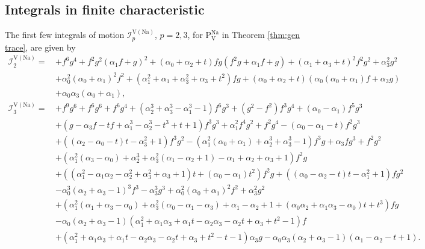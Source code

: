 \documentclass[a4paper,reqno]{amsart}
\numberwithin{equation}{section}
\numberwithin{figure}{section}
\theoremstyle{remark}
\newcommand\Pfive{\textrm{P}_{\textrm{V}}}
\begin{document}
\subsection{Integrals in finite characteristic}
The first few integrals of motion $\mathcal{I}_p^{\textrm{V}(\text{Na})}$, $p=2,3$, for $\Pfive^\text{Na}$ in Theorem \ref{thm:gen trace}, are given by
\begin{align*}
    \mathcal{I}_2^{\textrm{V}(\text{Na})}=\,&+f^6 g^4+f^2 g^2 (\alpha_1 f+g)^2+ (\alpha_0+\alpha_2+t)fg(f^2g+\alpha_1 f+g)+(\alpha_1+\alpha_3+t)^2f^2 g^2+\alpha_3^2 g^2\\
    &+ \alpha_0^2(\alpha_0+\alpha_1)^2 f^2+ \left(\alpha_1^2+\alpha_1+\alpha_3^2+\alpha_3+t^2\right)f g+(\alpha_0+\alpha_2+t) \left(\alpha_0(\alpha_0+\alpha_1) f+\alpha_3 g\right) \\
    &+\alpha_0\alpha_3(\alpha_0+\alpha_1),\\
     \mathcal{I}_3^{\textrm{V}(\text{Na})}=\,&+f^9 g^6+f^6 g^6+f^6 g^4+ \left(\alpha_2^3+\alpha_3^3- \alpha_1^3-1\right)f^6 g^3+\left(g^2-f^2\right)f^3 g^4 + (\alpha_0-\alpha_1)f^5 g^3\\
     &+ (g-\alpha_3f-tf+\alpha_1^3-\alpha_2^3-t^3+t+1)f^3 g^3+\alpha_1^2 f^4 g^2+f^2 g^4-  (\alpha_0- \alpha_1- t)f^2 g^3\\
     &+\left((\alpha_2-\alpha_0-t)t-\alpha_3^2+1\right)f^3 g^2-\left(\alpha_1^2(\alpha_0+\alpha_1)+ \alpha_2^3+\alpha_3^3-1\right)f^3 g+\alpha_3 f g^3+f^2 g^2\\
     &+\left(
     \alpha_1^2(\alpha_3-\alpha_0)+\alpha_2^3+\alpha_3^2(\alpha_1-\alpha_2+1)
     - \alpha_1+\alpha_2+\alpha_3+1\right)f^2g\\  
     &+\left(\left(\alpha_1^2- \alpha_1 \alpha_2- \alpha_2^2+\alpha_3^2+\alpha_3+1\right)t+ (\alpha_0-\alpha_1)t^2\right)f^2 g+\left((\alpha_0-\alpha_2-t)t- \alpha_1^2+1\right)f g^2 \\
     &-\alpha_0^3(\alpha_2+\alpha_3-1)^3 f^3- \alpha_3^3 g^3+\alpha_0^2(\alpha_0+\alpha_1)^2 f^2 +\alpha_3^2 g^2\\
     &+\left(\alpha_1^2(\alpha_1+\alpha_3-\alpha_0)+\alpha_3^2(\alpha_0-\alpha_1-\alpha_3)+\alpha_1-\alpha_2+1
    + (\alpha_0\alpha_2+\alpha_1\alpha_3-\alpha_0) t + t^3\right)f g\\
     &-\alpha_0(\alpha_2+\alpha_3-1) \left(\alpha_1^2+\alpha_1 \alpha_3+\alpha_1 t- \alpha_2 \alpha_3- \alpha_2 t+\alpha_3+t^2-1\right)f\\
     &+\left(\alpha_1^2+ \alpha_1 \alpha_3+\alpha_1 t-\alpha_2 \alpha_3-\alpha_2 t+ \alpha_3+ t^2-t-1\right)\alpha_3g-\alpha_0\alpha_3 (\alpha_2+\alpha_3-1) (\alpha_1-\alpha_2-t+1).
\end{align*}
\end{document}
